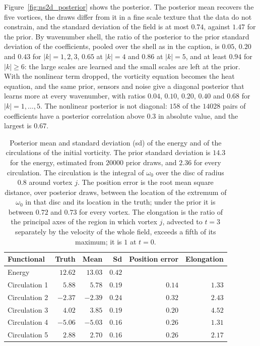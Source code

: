 Figure~\ref{fig:ns2d_posterior} shows the posterior. The posterior mean recovers the five vortices, the draws differ from it in a fine scale texture that the data do not constrain, and the standard deviation of the field is at most $0.74$, against $1.47$ for the prior. By wavenumber shell, the ratio of the posterior to the prior standard deviation of the coefficients, pooled over the shell as in the caption, is $0.05$, $0.20$ and $0.43$ for $|k|=1,2,3$, $0.65$ at $|k|=4$ and $0.86$ at $|k|=5$, and at least $0.94$ for $|k|\ge6$: the large scales are learned and the small scales are left at the prior. With the nonlinear term dropped, the vorticity equation becomes the heat equation, and the same prior, sensors and noise give a diagonal posterior that learns more at every wavenumber, with ratios $0.04$, $0.10$, $0.20$, $0.40$ and $0.68$ for $|k|=1,\dots,5$. The nonlinear posterior is not diagonal: $158$ of the $14028$ pairs of coefficients have a posterior correlation above $0.3$ in absolute value, and the largest is $0.67$.

\begin{table}[t]\centering\footnotesize\setlength{\tabcolsep}{5pt}
\caption{Posterior mean and standard deviation (sd) of the energy and of the circulations of the initial vorticity. The prior standard deviation is $14.3$ for the energy, estimated from $20000$ prior draws, and $2.36$ for every circulation. The circulation is the integral of $\omega_0$ over the disc of radius $0.8$ around vortex $j$. The position error is the root mean square distance, over posterior draws, between the location of the extremum of $\omega_0$ in that disc and its location in the truth; under the prior it is between $0.72$ and $0.73$ for every vortex. The elongation is the ratio of the principal axes of the region in which vortex $j$, advected to $t=3$ separately by the velocity of the whole field, exceeds a fifth of its maximum; it is $1$ at $t=0$.}\label{tab:ns2d_posterior}
\begin{tabular}{@{}lrrrrr@{}}
\toprule
Functional & Truth & Mean & Sd & Position error & Elongation\\
\midrule
Energy & $12.62$ & $13.03$ & $0.42$ & & \\
Circulation 1 & $5.88$ & $5.78$ & $0.19$ & $0.14$ & $1.33$\\
Circulation 2 & $-2.37$ & $-2.39$ & $0.24$ & $0.32$ & $2.43$\\
Circulation 3 & $4.02$ & $3.85$ & $0.19$ & $0.20$ & $4.52$\\
Circulation 4 & $-5.06$ & $-5.03$ & $0.16$ & $0.26$ & $1.31$\\
Circulation 5 & $2.88$ & $2.70$ & $0.16$ & $0.26$ & $2.17$\\
\bottomrule
\end{tabular}
\end{table}

